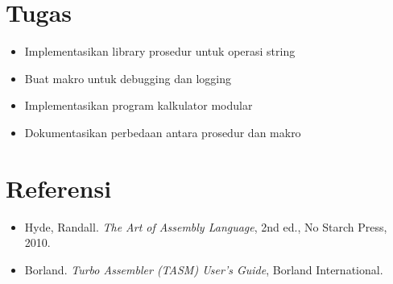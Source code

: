\section{Tugas}
\begin{itemize}
\item Implementasikan library prosedur untuk operasi string
\item Buat makro untuk debugging dan logging
\item Implementasikan program kalkulator modular
\item Dokumentasikan perbedaan antara prosedur dan makro
\end{itemize}

\section{Referensi}
\begin{itemize}
\item Hyde, Randall. \textit{The Art of Assembly Language}, 2nd ed., No Starch Press, 2010.
\item Borland. \textit{Turbo Assembler (TASM) User's Guide}, Borland International.
\end{itemize}

